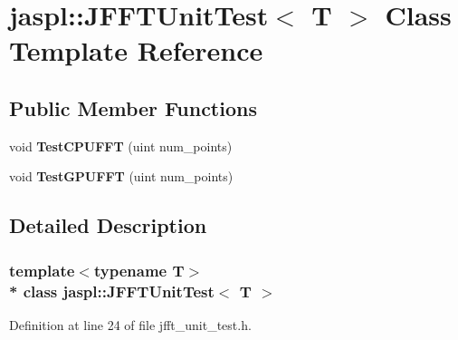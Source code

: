 \hypertarget{classjaspl_1_1_j_f_f_t_unit_test}{}\section{jaspl\+:\+:J\+F\+F\+T\+Unit\+Test$<$ T $>$ Class Template Reference}
\label{classjaspl_1_1_j_f_f_t_unit_test}
\subsection*{Public Member Functions}
\begin{DoxyCompactItemize}
\item 
void {\bfseries Test\+C\+P\+U\+F\+FT} (uint num\+\_\+points)\hypertarget{classjaspl_1_1_j_f_f_t_unit_test_aa5c21d0d4009818fabb5aafe14fdf060}{}\label{classjaspl_1_1_j_f_f_t_unit_test_aa5c21d0d4009818fabb5aafe14fdf060}

\item 
void {\bfseries Test\+G\+P\+U\+F\+FT} (uint num\+\_\+points)\hypertarget{classjaspl_1_1_j_f_f_t_unit_test_a23b93712b332b7ec767c97473f8a73fb}{}\label{classjaspl_1_1_j_f_f_t_unit_test_a23b93712b332b7ec767c97473f8a73fb}

\end{DoxyCompactItemize}


\subsection{Detailed Description}
\subsubsection*{template$<$typename T$>$\\*
class jaspl\+::\+J\+F\+F\+T\+Unit\+Test$<$ T $>$}



Definition at line 24 of file jfft\+\_\+unit\+\_\+test.\+h.

